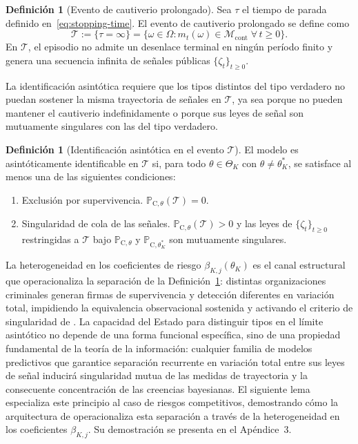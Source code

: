 \documentclass[review,authoryear,12pt]{elsarticle}
\theoremstyle{plain}
\theoremstyle{definition}
\newtheorem{definition}[theorem]{Definición}
\newcommand{\ProbC}[1]{\mathbb{P}_{\mathrm{C},#1}}
\newcommand{\ThetaK}{\Theta_K}
\newcommand{\1}{\mathbf{1}}
\begin{document}
\begin{definition}[Evento de cautiverio prolongado]\label{def:event-T-long}
Sea $\tau$ el tiempo de parada definido en~\eqref{eq:stopping-time}. El evento de cautiverio prolongado se define como
\[
\mathcal{T}:=\{\tau=\infty\}=\bigl\{\omega\in\Omega:m_t(\omega)\in\mathcal{M}_{\mathrm{cont}}\;\forall\,t\ge 0\bigr\}.
\]
En $\mathcal{T}$, el episodio no admite un desenlace terminal en ningún período finito y genera una secuencia infinita de señales públicas $\{\zeta_t\}_{t\ge 0}$.
\end{definition}

La identificación asintótica requiere que los tipos distintos del tipo verdadero no puedan sostener la misma trayectoria de señales en $\mathcal{T}$, ya sea porque no pueden mantener el cautiverio indefinidamente o porque sus leyes de señal son mutuamente singulares con las del tipo verdadero.

\begin{definition}[Identificación asintótica en el evento $\mathcal{T}$]\label{def:asymptotic-id}
El modelo es asintóticamente identificable en $\mathcal{T}$ si, para todo $\theta\in\ThetaK$ con $\theta\neq\theta_K^\ast$, se satisface al menos una de las siguientes condiciones:
\begin{enumerate}
  \item[\textup{(a)}] Exclusión por supervivencia. $\ProbC{\theta}(\mathcal{T})=0$.
  \item[\textup{(b)}] Singularidad de cola de las señales. $\ProbC{\theta}(\mathcal{T})>0$ y las leyes de $\{\zeta_t\}_{t\ge 0}$ restringidas a $\mathcal{T}$ bajo $\ProbC{\theta}$ y $\ProbC{\theta_K^\ast}$ son mutuamente singulares.
\end{enumerate}
\end{definition}

La heterogeneidad en los coeficientes de riesgo $\beta_{K,j}(\theta_K)$ es el canal estructural que operacionaliza la separación de la Definición~\ref{def:asymptotic-id}: distintas organizaciones criminales generan firmas de supervivencia y detección diferentes en variación total, impidiendo la equivalencia observacional sostenida y activando el criterio de singularidad de \citet{Kakutani1948}. La capacidad del Estado para distinguir tipos en el límite asintótico no depende de una forma funcional específica, sino de una propiedad fundamental de la teoría de la información: cualquier familia de modelos predictivos que garantice separación recurrente en variación total entre sus leyes de señal inducirá singularidad mutua de las medidas de trayectoria y la consecuente concentración de las creencias bayesianas. El siguiente lema especializa este principio al caso de riesgos competitivos, demostrando cómo la arquitectura de \citet{Cox1972} operacionaliza esta separación a través de la heterogeneidad en los coeficientes $\beta_{K,j}$. Su demostración se presenta en el Apéndice~3.
\end{document}
